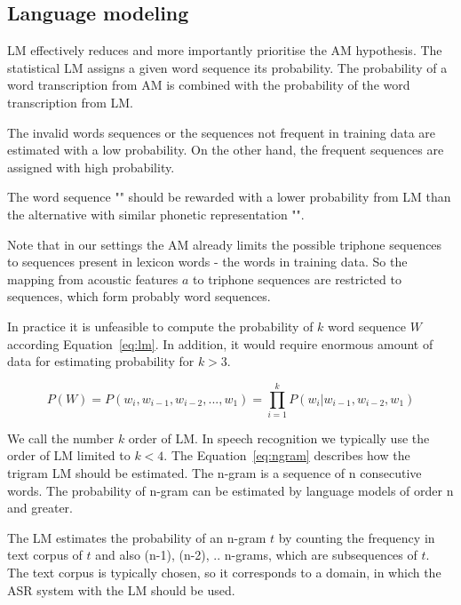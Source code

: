 {\subsection{Language modeling}
\label{sub:lm}

\ac{LM} effectively reduces and more importantly prioritise the \ac{AM} hypothesis.
The statistical \ac{LM} assigns a given word sequence its probability.
The probability of a word transcription from \ac{AM} is combined with the probability of the word transcription from \ac{LM}.

The invalid words sequences or the sequences not frequent in training data are estimated with a low probability. 
On the other hand, the frequent sequences are assigned with high probability.

The word sequence "" should be rewarded with a lower probability from \ac{LM} than the alternative with similar phonetic representation "".

Note that in our settings the \ac{AM} already limits the possible triphone sequences to sequences present in lexicon words - the words in training data.
So the mapping from acoustic features $a$ to triphone sequences are restricted to sequences, which form probably word sequences.

In practice it is unfeasible to compute the probability of $k$ word sequence $W$ according Equation~\ref{eq:lm}.
In addition, it would require enormous amount of data for estimating probability for $k>3$.


\begin{equation} \label{eq:lm}
    P(W)=P(w_i,  w_{i-1}, w_{i-2}, ..., w_1)=\prod_{i=1}^{k}{P(w_i|w_{i-1}, w_{i-2}, w_1)}
\end{equation}

We call the number $k$ order of \ac{LM}.
In speech recognition we typically use the order of \ac{LM} limited to $k<4$.
The Equation~\ref{eq:ngram} describes how the trigram \ac{LM} should be estimated.
The n-gram is a sequence of n consecutive words. The probability of n-gram can be estimated by language models
of order n and greater.

The \ac{LM} estimates the probability of an n-gram $t$ by counting the frequency in text corpus of $t$ and 
also (n-1), (n-2), .. n-grams, which are subsequences of $t$.
The text corpus is typically chosen, so it corresponds to a domain, in which the \ac{ASR} system 
with the \ac{LM} should be used.

}
